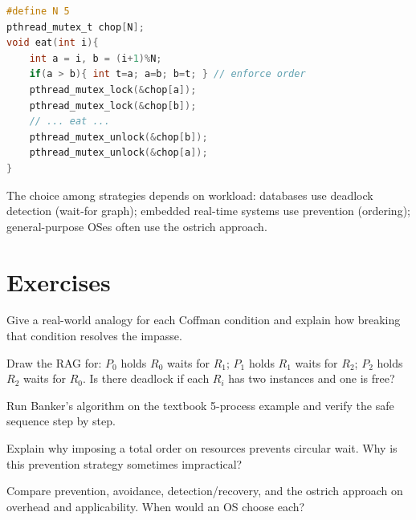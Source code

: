 \begin{lstlisting}[language=C,caption={Ordered chopstick acquisition prevents deadlock}]
#define N 5
pthread_mutex_t chop[N];
void eat(int i){
    int a = i, b = (i+1)%N;
    if(a > b){ int t=a; a=b; b=t; } // enforce order
    pthread_mutex_lock(&chop[a]);
    pthread_mutex_lock(&chop[b]);
    // ... eat ...
    pthread_mutex_unlock(&chop[b]);
    pthread_mutex_unlock(&chop[a]);
}
\end{lstlisting}

The choice among strategies depends on workload: databases use
deadlock detection (wait-for graph); embedded real-time systems use prevention
(ordering); general-purpose OSes often use the ostrich approach.

\section{Exercises}
\label{sec:ch05-ex}
\begin{exercise}
Give a real-world analogy for each Coffman condition and explain how breaking
that condition resolves the impasse.
\end{exercise}
\begin{exercise}
Draw the RAG for: $P_0$ holds $R_0$ waits for $R_1$; $P_1$ holds $R_1$ waits for
$R_2$; $P_2$ holds $R_2$ waits for $R_0$. Is there deadlock if each $R_i$ has
two instances and one is free?
\end{exercise}
\begin{exercise}
Run Banker's algorithm on the textbook 5-process example and verify the safe
sequence step by step.
\end{exercise}
\begin{exercise}
Explain why imposing a total order on resources prevents circular wait. Why is
this prevention strategy sometimes impractical?
\end{exercise}
\begin{exercise}
Compare prevention, avoidance, detection/recovery, and the ostrich approach on
overhead and applicability. When would an OS choose each?
\end{exercise}
